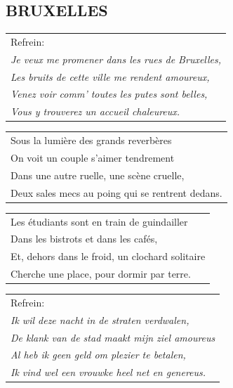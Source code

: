 \documentclass{article}
\begin{document}
\subsection*{BRUXELLES}
\begin{flushleft}
\begin{tabularx}{0.8\textwidth} {
   >{\raggedright\arraybackslash}X}
   Refrein:\\
\textit{Je veux me promener dans les rues de Bruxelles,}\\
\textit{Les bruits de cette ville me rendent amoureux,}\\
\textit{Venez voir comm’ toutes les putes sont belles,}\\
\textit{Vous y trouverez un accueil chaleureux.}\\
\end{tabularx}
\end{flushleft}
\begin{flushleft}
\begin{tabularx}{0.8\textwidth} {
   >{\raggedright\arraybackslash}X}
Sous la lumière des grands reverbères\\
On voit un couple s’aimer tendrement\\
Dans une autre ruelle, une scène cruelle,\\
Deux sales mecs au poing qui se rentrent dedans.\\
\end{tabularx}
\end{flushleft}
\begin{flushleft}
\begin{tabularx}{0.8\textwidth} {
   >{\raggedright\arraybackslash}X}
Les étudiants sont en train de guindailler\\
Dans les bistrots et dans les cafés,\\
Et, dehors dans le froid, un clochard solitaire\\
Cherche une place, pour dormir par terre.\\
\end{tabularx}
\end{flushleft}
\begin{flushleft}
\begin{tabularx}{0.8\textwidth} {
   >{\raggedright\arraybackslash}X}
   Refrein:\\
\textit{Ik wil deze nacht in de straten verdwalen,}\\
\textit{De klank van de stad maakt mijn ziel amoureus}\\
\textit{Al heb ik geen geld om plezier te betalen,}\\
\textit{Ik vind wel een vrouwke heel net en genereus.}\\
\end{tabularx}
\end{flushleft}
\end{document}
